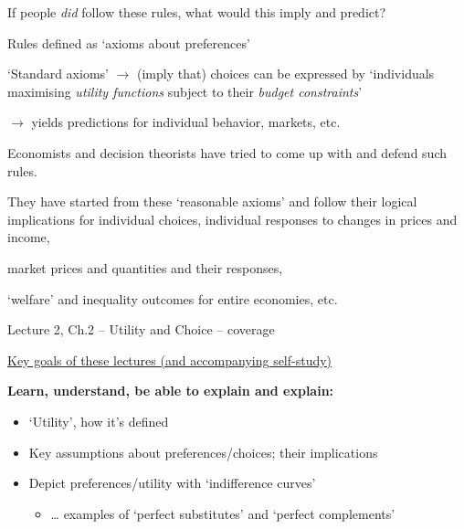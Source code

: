 \documentclass[table]{beamer}
\providecommand{\tightlist}{%
  \setlength{\itemsep}{0pt}\setlength{\parskip}{0pt}}
\begin{document}
\begin{frame}

\Huge If people \emph{did} follow these rules, what would this imply and
predict? \normalsize

Rules defined as `axioms about preferences'

`Standard axioms' \(\rightarrow\) (imply that) choices can be expressed
by `individuals maximising \emph{utility functions} subject to their
\emph{budget constraints}'

\(\rightarrow\) yields predictions for individual behavior, markets,
etc.

Economists and decision theorists have tried to come up with and defend
such rules.

They have started from these `reasonable axioms' and follow their
logical implications for \textCR individual choices, individual
responses to changes in prices and income,

market prices and quantities and their responses,

`welfare' and inequality outcomes for entire economies, etc.

\end{frame}

\begin{frame}{Lecture 2, Ch.2 -- Utility and Choice -- coverage}
\protect\hypertarget{lecture-2-ch.2-utility-and-choice-coverage}{}

\underline{Key goals of these lectures (and accompanying self-study)}

\textbf{Learn, understand, be able to explain and explain:}

\begin{itemize}
\item
  `Utility', how it's defined
\item
  Key assumptions about preferences/choices; their implications
\end{itemize}

\begin{itemize}
\tightlist
\item
  Depict preferences/utility with `indifference curves'

  \begin{itemize}
  \tightlist
  \item
    \ldots{} examples of `perfect substitutes' and `perfect complements'
  \end{itemize}
\end{itemize}

\end{frame}
\end{document}
